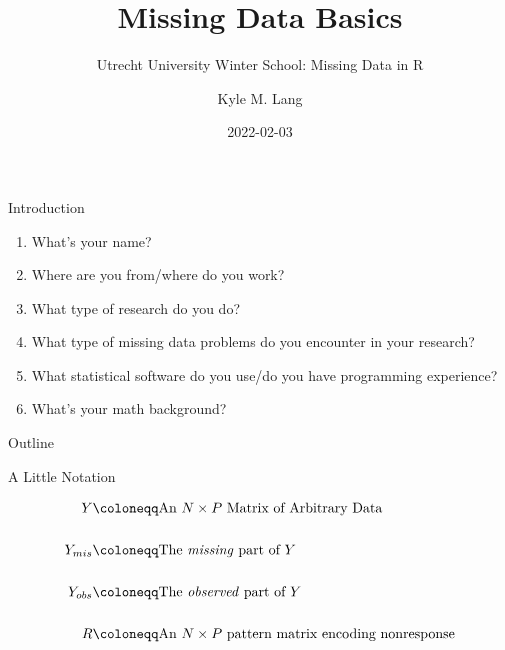 \documentclass{beamer}\usepackage[]{graphicx}\usepackage[]{color}
\title{Missing Data Basics}
\subtitle{Utrecht University Winter School: Missing Data in R}
\author{Kyle M. Lang}
\institute{Department of Methodology \& Statistics\\Utrecht University}
\date{2022-02-03}
\begin{document}

\begin{frame}[t, plain]
  \titlepage
\end{frame}


\begin{frame}{Introduction}

  \begin{enumerate}
  \item What's your name?
    \vc
  \item Where are you from/where do you work?
    \vc
  \item What type of research do you do?
    \vc
  \item What type of missing data problems do you encounter in your research?
    \vc
  \item What statistical software do you use/do you have programming experience?
    \vc
  \item What's your math background?
  \end{enumerate}
  
\end{frame}


\begin{frame}{Outline}
  \tableofcontents
\end{frame}


\begin{frame}{A Little Notation}
  
  \begin{align*}
    Y &\coloneqq \text{An $N \times P$ Matrix of Arbitrary Data}\\
    \\
    Y_{mis} &\coloneqq \text{The \emph{missing} part of $Y$}\\
    \\
    Y_{obs} &\coloneqq \text{The \emph{observed} part of $Y$}\\
    \\
    R &\coloneqq \text{An $N \times P$ pattern matrix encoding nonresponse}
  \end{align*}
  
\end{frame}
\end{document}
